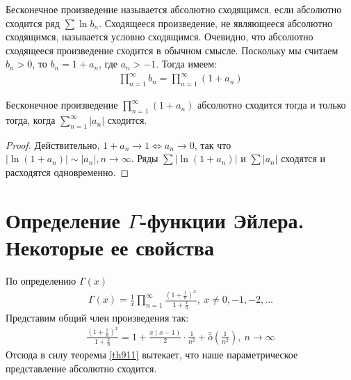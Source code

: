 \begin{definition}
  Бесконечное произведение называется абсолютно сходящимся, если абсолютно
  сходится ряд $\sum \ln b_n$. Сходящееся произведение, не являющееся абсолютно
  сходящимся, называется условно сходящимся. Очевидно, что абсолютно сходящееся
  произведение сходится в обычном смысле. Поскольку мы считаем $b_n > 0$, то
  $b_n = 1 + a_n$, где $a_n > -1$. Тогда имеем:
  \begin{gather*}
    \prod\limits_{n = 1}^\infty b_n = \prod\limits_{n = 1}^\infty (1 + a_n)
  \end{gather*}
\end{definition}

\begin{theorem}
  \label{th911}
  Бесконечное произведение $\prod\limits_{n = 1}^\infty (1 + a_n)$ абсолютно
  сходится тогда и только тогда, когда $\sum\limits_{n = 1}^{\infty} |a_n|$
  сходится.
\end{theorem}

\begin{proof}
  Действительно, $1+a_n \to 1 \Longleftrightarrow a_n \to 0$, так что $|\ln (1 +
  a_n)| \sim |a_n|, n \to \infty$. Ряды $\sum |\ln (1 + a_n)|$ и $\sum |a_n|$
  сходятся и расходятся одновременно.
\end{proof}

\section{Определение $\Gamma$-функции Эйлера. Некоторые ее свойства}
По определению $\Gamma(x)$
\begin{gather}
  \Gamma(x) = \frac{1}{x} \prod\limits_{n = 1}^{\infty} \frac{(1 +
  \frac{1}{n})^x}{1 + \frac{x}{n}}, \ x \not = 0, -1, -2, \dots
  \label{ch92:eq1}
\end{gather}
Представим общий член произведения так:
\begin{gather*}
  \frac{(1 + \frac{1}{n})^x}{1 + \frac{x}{n}} = 1 + \frac{x(x - 1)}{2} \cdot
  \frac{1}{n^2} + \bar{\bar{o}}\left(\frac{1}{n^2}\right), \ n \to \infty
\end{gather*}
Отсюда в силу теоремы \eqref{th911} вытекает, что наше параметрическое
представление абсолютно сходится. \\

